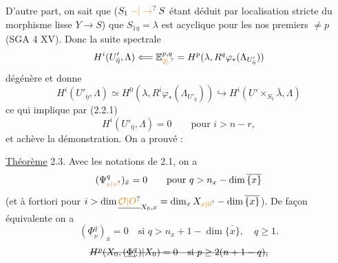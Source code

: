 D'autre part,  on sait que  ($S_1\mathbin{\unsure{-|\to}}S$ étant déduit par localisation stricte du morphisme lisse $Y\to S$) que $S_{1\eta}=\lambda$ est acyclique pour les nos premiers $\ne p$ (SGA 4 XV). Donc la suite spectrale
\[
H^i(U'_{\bar\eta},\Lambda)\Longleftarrow\mathbb E_{\unsure{2|,}}^{p,q}=H^p(\lambda,R^q\varphi_*(\Lambda_{U'_{\bar\eta}}))
\]
dégénère et donne
\[
H^i(U'_{\bar\eta},\Lambda)\simeq H^0(\lambda,R^i\varphi_*(\Lambda_{U'_{\bar\eta}}))\hookrightarrow H^i(U'\times_{S_1}\bar\lambda,\Lambda)
\tag*{(2.2.2)}
\]
ce qui implique par (2.2.1)
\[
H^i(U'_{\bar\eta},\Lambda)=0\qquad\text{pour }i>n-r,
\]
et achève la démonstration. On a prouvé :

\uline{Théorème} 2.3. Avec les notations de 2.1, on a 
\[
(\Psi^q_{\unsure{\nu|v}})_{\bar x}=0\qquad\text{pour }q>n_x-\dim\overline{\{x\}}
\]
(et à fortiori pour $i>\dim\underline{\unsure{\mathcal O|O}}_{X_0,x}=\dim_x X_{\unsure{x|0}}-\dim\overline{\{x\}}$).
De façon équivalente on a
\[
(\underline\Phi^q_\nu)_{\bar x}=0\quad\text{si }q>n_x+1-\dim\overline{\{x\}},\quad q\geq1.
\]
\[
\deleted{H^p(X_0,(\underline\Phi^q_\nu)|X_0)=0\quad\text{si }p\geq2(n+1-q),}
\]


